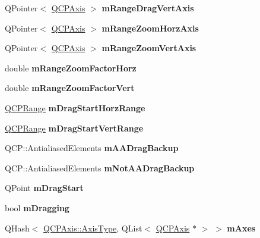 \begin{DoxyCompactItemize}
Q\+Pointer$<$ \hyperlink{class_q_c_p_axis}{Q\+C\+P\+Axis} $>$ {\bfseries m\+Range\+Drag\+Vert\+Axis}
\item 
\hypertarget{class_q_c_p_axis_rect_ae22f882bab20518559f3fbb84243d0ab}{}\label{class_q_c_p_axis_rect_ae22f882bab20518559f3fbb84243d0ab} 
Q\+Pointer$<$ \hyperlink{class_q_c_p_axis}{Q\+C\+P\+Axis} $>$ {\bfseries m\+Range\+Zoom\+Horz\+Axis}
\item 
\hypertarget{class_q_c_p_axis_rect_a8b9acd16a203a9692bd35a9465f54bc1}{}\label{class_q_c_p_axis_rect_a8b9acd16a203a9692bd35a9465f54bc1} 
Q\+Pointer$<$ \hyperlink{class_q_c_p_axis}{Q\+C\+P\+Axis} $>$ {\bfseries m\+Range\+Zoom\+Vert\+Axis}
\item 
\hypertarget{class_q_c_p_axis_rect_ad08d0250ed7b99de387d0ea6c7fd4dc1}{}\label{class_q_c_p_axis_rect_ad08d0250ed7b99de387d0ea6c7fd4dc1} 
double {\bfseries m\+Range\+Zoom\+Factor\+Horz}
\item 
\hypertarget{class_q_c_p_axis_rect_a32f063629581d5bf82b12769940b34ad}{}\label{class_q_c_p_axis_rect_a32f063629581d5bf82b12769940b34ad} 
double {\bfseries m\+Range\+Zoom\+Factor\+Vert}
\item 
\hypertarget{class_q_c_p_axis_rect_a41936cf473ec638bec382f5a40cdb1f3}{}\label{class_q_c_p_axis_rect_a41936cf473ec638bec382f5a40cdb1f3} 
\hyperlink{class_q_c_p_range}{Q\+C\+P\+Range} {\bfseries m\+Drag\+Start\+Horz\+Range}
\item 
\hypertarget{class_q_c_p_axis_rect_a1a5ae4c74b8bd46baf91bf4e4f4165f0}{}\label{class_q_c_p_axis_rect_a1a5ae4c74b8bd46baf91bf4e4f4165f0} 
\hyperlink{class_q_c_p_range}{Q\+C\+P\+Range} {\bfseries m\+Drag\+Start\+Vert\+Range}
\item 
\hypertarget{class_q_c_p_axis_rect_aa4a24f76360cfebe1bcf17a77fa7521b}{}\label{class_q_c_p_axis_rect_aa4a24f76360cfebe1bcf17a77fa7521b} 
Q\+C\+P\+::\+Antialiased\+Elements {\bfseries m\+A\+A\+Drag\+Backup}
\item 
\hypertarget{class_q_c_p_axis_rect_a6fcb12e052e276d57efbb128be31d6f5}{}\label{class_q_c_p_axis_rect_a6fcb12e052e276d57efbb128be31d6f5} 
Q\+C\+P\+::\+Antialiased\+Elements {\bfseries m\+Not\+A\+A\+Drag\+Backup}
\item 
\hypertarget{class_q_c_p_axis_rect_a032896b28f83a58010d8d533b78c49df}{}\label{class_q_c_p_axis_rect_a032896b28f83a58010d8d533b78c49df} 
Q\+Point {\bfseries m\+Drag\+Start}
\item 
\hypertarget{class_q_c_p_axis_rect_ab49a6698194cf0e9e38a1d734c0888a8}{}\label{class_q_c_p_axis_rect_ab49a6698194cf0e9e38a1d734c0888a8} 
bool {\bfseries m\+Dragging}
\item 
\hypertarget{class_q_c_p_axis_rect_afe7a24d2a2bea98fc552fa826350ba81}{}\label{class_q_c_p_axis_rect_afe7a24d2a2bea98fc552fa826350ba81} 
Q\+Hash$<$ \hyperlink{class_q_c_p_axis_ae2bcc1728b382f10f064612b368bc18a}{Q\+C\+P\+Axis\+::\+Axis\+Type}, Q\+List$<$ \hyperlink{class_q_c_p_axis}{Q\+C\+P\+Axis} $\ast$ $>$ $>$ {\bfseries m\+Axes}
\end{DoxyCompactItemize}
